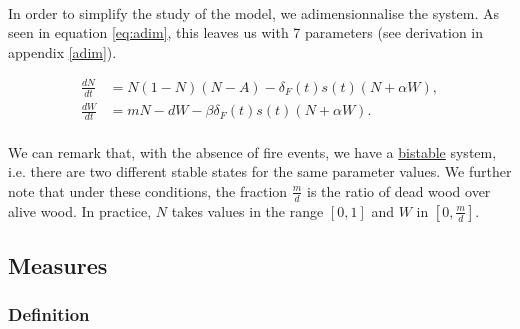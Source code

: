 \documentclass{article}
\begin{document}
\paragraph{}
In order to simplify the study of the model, we adimensionnalise the system. As seen in equation \ref{eq:adim}, this leaves us with 7 parameters (see derivation in appendix \ref{adim}). 

\begin{subequations}\label{eq:adim}
 \begin{align}
\frac{dN}{dt} & =  N(1-N)(N-A) - \delta_F(t)s(t)(N+\alpha W), \\
\frac{dW}{dt} & =  mN -dW - \beta\delta_F(t)s(t)(N+\alpha W).
 \end{align}
\end{subequations}

\paragraph{} %
We can remark that, with the absence of fire events, we have a \hyperref[equi]{bistable} system, i.e. there are two different stable states for the same parameter values. We further note that under these conditions, the fraction $\frac{m}{d}$ is the ratio of dead wood over alive wood. In practice, $N$ takes values in the range $[0,1]$ and $W$ in $[0, \frac{m}{d}]$.





\newpage
\subsection{Measures}


\subsubsection{Definition}
\label{collapse_probability}
\end{document}
